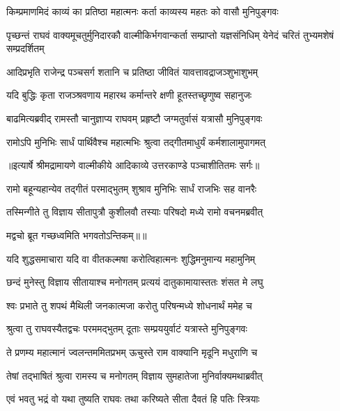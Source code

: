 \twolineshloka
{किम्प्रमाणमिदं काव्यं का प्रतिष्ठा महात्मनः}
{कर्ता काव्यस्य महतः को वासौ मुनिपुङ्गवः} %

\threelineshloka
{पृच्छन्तं राघवं वाक्यमूचतुर्मुनिदारकौ}
{वाल्मीकिर्भगवान्कर्ता सम्प्राप्तो यज्ञसंनिधिम्}
{येनेदं चरितं तुभ्यमशेषं सम्प्रदर्शितम्} %

\twolineshloka
{आदिप्रभृति राजेन्द्र पञ्चसर्ग शतानि च}
{प्रतिष्ठा जीवितं यावत्तावद्राजञ्शुभाशुभम्} %

\twolineshloka
{यदि बुद्धिः कृता राजञ्श्रवणाय महारथ}
{कर्मान्तरे क्षणी हूतस्तच्छृणुष्व सहानुजः} %

\twolineshloka
{बाढमित्यब्रवीद् रामस्तौ चानुज्ञाप्य राघवम्}
{प्रहृष्टौ जग्मतुर्वासं यत्रासौ मुनिपुङ्गवः} %

\twolineshloka
{रामोऽपि मुनिभिः सार्धं पार्थिवैश्च महात्मभिः}
{श्रुत्वा तद्गीतमाधुर्यं कर्मशालामुपागमत्} %


{॥इत्यार्षे श्रीमद्रामायणे वाल्मीकीये आदिकाव्ये उत्तरकाण्डे पञ्चाशीतितमः सर्गः॥}


\twolineshloka
{रामो बहून्यहान्येव तद्गीतं परमाद्भुतम्}
{शुश्राव मुनिभिः सार्धं राजभिः सह वानरैः} %

\twolineshloka
{तस्मिन्गीते तु विज्ञाय सीतापुत्रौ कुशीलवौ}
{तस्याः परिषदो मध्ये रामो वचनमब्रवीत्} %

{मद्वचो ब्रूत गच्छध्वमिति भगवतोऽन्तिकम्॥॥} %

\addtocounter{shlokacount}{1}

\twolineshloka
{यदि शुद्धसमाचारा यदि वा वीतकल्मषा}
{करोत्विहात्मनः शुद्धिमनुमान्य महामुनिम्} %

\twolineshloka
{छन्दं मुनेस्तु विज्ञाय सीतायाश्च मनोगतम्}
{प्रत्ययं दातुकामायास्ततः शंसत मे लघु} %

\twolineshloka
{श्वः प्रभाते तु शपथं मैथिली जनकात्मजा}
{करोतु परिषन्मध्ये शोधनार्थं ममेह च} %

\twolineshloka
{श्रुत्वा तु राघवस्यैतद्वचः परममद्भुतम्}
{दूताः सम्प्रययुर्वाटं यत्रास्ते मुनिपुङ्गवः} %

\twolineshloka
{ते प्रणम्य महात्मानं ज्वलन्तममितप्रभम्}
{ऊचुस्ते राम वाक्यानि मृदूनि मधुराणि च} %

\twolineshloka
{तेषां तद्भाषितं श्रुत्वा रामस्य च मनोगतम्}
{विज्ञाय सुमहातेजा मुनिर्वाक्यमथाब्रवीत्} %

\twolineshloka
{एवं भवतु भद्रं वो यथा तुष्यति राघवः}
{तथा करिष्यते सीता दैवतं हि पतिः स्त्रियाः} %

